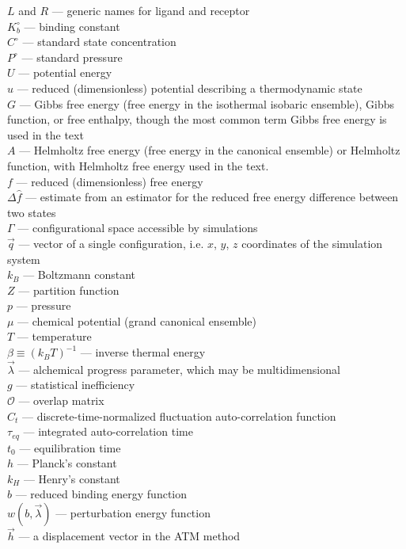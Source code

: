 \documentclass[9pt,bestpractices]{livecoms}
\begin{document}
\begin{tcolorbox}[title=List of Symbols, colback=green!10!white]
$L$ and $R$ --- generic names for ligand and receptor\\
$K_b^{\circ}$ --- binding  constant \\
$C^{\circ}$ --- standard state concentration \\
$P^{\circ}$ --- standard pressure \\
$U$ --- potential energy\\
$u$ --- reduced (dimensionless) potential describing a thermodynamic state \\
$G$ --- Gibbs free energy (free energy in the isothermal isobaric ensemble), Gibbs function, or free enthalpy, though the most common term Gibbs free energy is used in the text\\
$A$ --- Helmholtz free energy (free energy in the canonical ensemble) or Helmholtz function, with Helmholtz free energy used in the text.\\
$f$ --- reduced (dimensionless) free energy \\
$\Delta \hat{f}$ --- estimate from an estimator for the reduced free energy difference between two states\\
$\Gamma$ --- configurational space accessible by simulations \\
$\vec{q}$ --- vector of a single configuration, i.e. $x$, $y$, $z$ coordinates of the simulation system\\
$k_B$ --- Boltzmann constant \\
$Z$ --- partition function \\
$p$ --- pressure \\
$\mu$ --- chemical potential (grand canonical ensemble)\\
$T$ --- temperature \\
$\beta \equiv (k_B T)^{-1}$ --- inverse thermal energy \\
$\vec{\lambda}$ --- alchemical progress parameter, which may be multidimensional \\
$g$ --- statistical inefficiency\\
$\mathcal{O}$ --- overlap matrix\\
$C_t$ --- discrete-time-normalized fluctuation auto-correlation function\\
$\tau _{eq}$ --- integrated auto-correlation time\\
$t_0$ --- equilibration time \\
$h$ --- Planck's constant \\
$k_H$ --- Henry's constant \\
$b$ --- reduced binding energy function \\
$w(b, \vec{\lambda})$ --- perturbation energy function \\
$\vec{h}$ --- a displacement vector in the ATM method
\end{tcolorbox}
\end{document}
